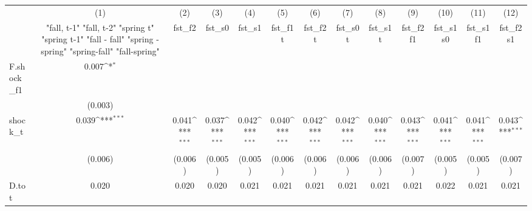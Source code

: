 {
\def\sym#1{\ifmmode^{#1}\else\(^{#1}\)\fi}
\begin{tabular}{l*{12}{c}}
\toprule
            &\multicolumn{1}{c}{(1)}&\multicolumn{1}{c}{(2)}&\multicolumn{1}{c}{(3)}&\multicolumn{1}{c}{(4)}&\multicolumn{1}{c}{(5)}&\multicolumn{1}{c}{(6)}&\multicolumn{1}{c}{(7)}&\multicolumn{1}{c}{(8)}&\multicolumn{1}{c}{(9)}&\multicolumn{1}{c}{(10)}&\multicolumn{1}{c}{(11)}&\multicolumn{1}{c}{(12)}\\
            &\multicolumn{1}{c}{  "fall, t-1" "fall, t-2" "spring t" "spring t-1"  "fall - fall" "spring - spring" "spring-fall" "fall-spring" }&\multicolumn{1}{c}{fst\_f2}&\multicolumn{1}{c}{fst\_s0}&\multicolumn{1}{c}{fst\_s1}&\multicolumn{1}{c}{fst\_f1t}&\multicolumn{1}{c}{fst\_f2t}&\multicolumn{1}{c}{fst\_s0t}&\multicolumn{1}{c}{fst\_s1t}&\multicolumn{1}{c}{fst\_f2f1}&\multicolumn{1}{c}{fst\_s1s0}&\multicolumn{1}{c}{fst\_s1f1}&\multicolumn{1}{c}{fst\_f2s1}\\
\midrule
F.shock\_f1  &       0.007\sym{*}  &                     &                     &                     &                     &                     &                     &                     &                     &                     &                     &                     \\
            &     (0.003)         &                     &                     &                     &                     &                     &                     &                     &                     &                     &                     &                     \\
\addlinespace
shock\_t     &       0.039\sym{***}&       0.041\sym{***}&       0.037\sym{***}&       0.042\sym{***}&       0.040\sym{***}&       0.042\sym{***}&       0.042\sym{***}&       0.040\sym{***}&       0.043\sym{***}&       0.041\sym{***}&       0.041\sym{***}&       0.043\sym{***}\\
            &     (0.006)         &     (0.006)         &     (0.005)         &     (0.005)         &     (0.006)         &     (0.006)         &     (0.006)         &     (0.006)         &     (0.007)         &     (0.005)         &     (0.005)         &     (0.007)         \\
\addlinespace
D.tot       &       0.020         &       0.020         &       0.020         &       0.021         &       0.021         &       0.021         &       0.021         &       0.021         &       0.021         &       0.022         &       0.021         &       0.021         \\

\end{tabular}}
